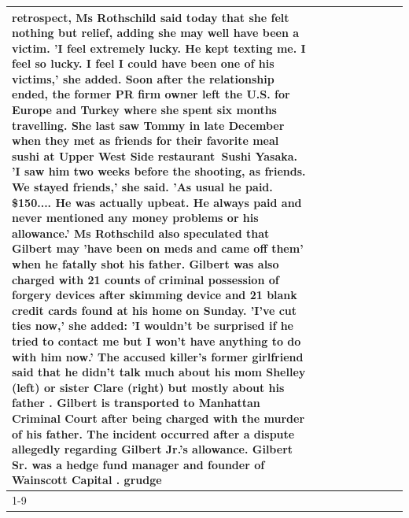 \begin{table}[H]
\begin{tabular}{lllrlllll}
retrospect, Ms Rothschild said today that she felt nothing but relief, adding she may well have been a victim. 'I feel extremely lucky. He kept texting me. I feel so lucky. I feel I could have been one of his victims,' she added. Soon after the relationship ended, the former PR firm owner left the U.S. for Europe and Turkey where she spent six months  travelling. She last saw Tommy in late December when they met as friends for their favorite meal sushi at Upper West Side restaurant Sushi Yasaka. 'I saw him two weeks before the shooting, as friends. We stayed friends,' she said. 'As usual he paid. \$150.... He was actually upbeat. He always paid and never mentioned any money problems or his allowance.' Ms Rothschild also speculated that Gilbert may 'have been on meds and came off them' when he fatally shot his father. Gilbert was also charged with 21 counts of criminal possession of forgery devices after skimming device and 21 blank credit cards found at his home on Sunday. 'I've cut ties now,' she added: 'I wouldn’t be surprised if he tried to contact me but I won’t have anything to do with him now.' The accused killer's former girlfriend said that he didn't talk much about his mom Shelley (left) or sister Clare (right) but mostly about his father . Gilbert is transported to Manhattan Criminal Court  after being charged with the murder of his father. The incident occurred after a dispute allegedly regarding Gilbert Jr.'s allowance. Gilbert Sr. was a hedge fund manager and founder of Wainscott Capital . grudge \\
\cline{1-9}

\end{tabular}
\end{table}
